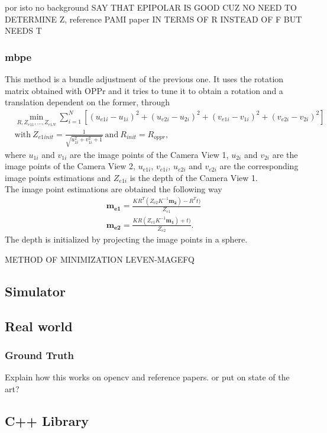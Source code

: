por isto no background
SAY THAT EPIPOLAR IS GOOD CUZ NO NEED TO DETERMINE Z, reference PAMI paper
IN TERMS OF R INSTEAD OF F BUT NEEDS T
\subsubsection{\acrlong{mbpe}}
\label{MBaPE}
This method is a bundle adjustment of the previous one. It uses the rotation matrix obtained with OPPr and it tries to tune it to obtain a rotation and a translation dependent on the former, through 
\begin{align*}
	& \min_{R, Z_{e11}, ..., Z_{e1N}} \sum^N_{i=1} [(u_{e1i}-u_{1i})^2 + (u_{e2i}-u_{2i})^2 + (v_{e1i}-v_{1i})^2 + (v_{e2i}-v_{2i})^2]\\
	& \text{with} \ Z_{e1init} = \frac{1}{\sqrt{u_{1i}^2 + v_{1i}^2 + 1}} \ \text{and} \ R_{init} = R_{oppr},
\end{align*}
where $u_{1i}$ and $v_{1i}$ are the image points of the Camera View 1, $u_{2i}$ and $v_{2i}$ are the image points of the Camera View 2, $u_{e1i}$, $v_{e1i}$, $u_{e2i}$ and $v_{e2i}$ are the corresponding image points estimations and $Z_{e1i}$ is the depth of the Camera View 1.\\
The image point estimations are obtained the following way
\begin{align*}
	\mathbf{m_{e1}} = \frac{KR^T(Z_{e2}K^{-1}\mathbf{m_2}) - R^Tt)}{Z_{e1}}\\
	\mathbf{m_{e2}} = \frac{KR(Z_{e1}K^{-1}\mathbf{m_1}) + t)}{Z_{e2}}.
\end{align*} The depth is initialized by projecting the image points in a sphere.

METHOD OF MINIMIZATION LEVEN-MAGEFQ

\subsection{Simulator}

\subsection{Real world}

\subsubsection{Ground Truth}

Explain how this works on opencv and reference papers. or put on state of the art?

\subsection{C++ Library}